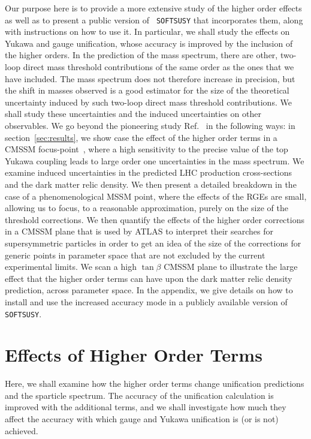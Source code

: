 \documentclass[final,3p,times,pdflatex]{elsarticle}
\begin{document}
Our purpose here is to provide a more extensive
study of the higher order effects as well as to present a public version of {\tt
  SOFTSUSY} that incorporates them, along with instructions on how to use it.
In particular, we shall study the effects on Yukawa and gauge unification,
whose accuracy is improved by the inclusion of the higher orders.
In the prediction of the mass spectrum, there are other, two-loop direct mass
threshold 
contributions of the same order as the ones that we have included. The mass
spectrum does not therefore increase in precision, but the shift in masses
observed 
is a good estimator for the size of the theoretical uncertainty induced by
such two-loop direct mass threshold contributions. We shall study these
uncertainties and the induced uncertainties on other observables.
We go beyond the pioneering study Ref.~\cite{Bednyakov:2010ni} in the
following ways: in section~\ref{sec:results}, we show case the effect of the
higher order terms in a CMSSM  
focus-point~\cite{Chan:1997bi,Feng:1999mn,Feng:1999zg}, where a high
sensitivity to the precise value of the top Yukawa 
coupling leads to large order one uncertainties in the mass spectrum. 
We examine induced uncertainties in the predicted LHC production
cross-sections and the dark matter relic density.
We then present a detailed
breakdown in the case of a phenomenological MSSM point, where the effects of
the RGEs are 
small, allowing us to focus, to a reasonable approximation, purely on the size
of the threshold corrections. We then quantify the effects of the higher order
corrections in a CMSSM plane that is used by ATLAS to interpret their searches
for supersymmetric particles in order to get an idea of the size of the
corrections for generic points in parameter space that are not excluded by the
current experimental limits. 
We scan a high $\tan \beta$ CMSSM plane to illustrate the large effect that the
higher order terms can have upon the dark matter relic density prediction,
across parameter space. 
In the appendix, we give details on how to install and use the increased
accuracy mode in a publicly available version of {\tt SOFTSUSY}.

\section{Effects of Higher Order Terms
 \label{sec:results}} 
Here, we shall examine how the higher order terms change unification
predictions and the sparticle spectrum. The accuracy of the unification 
calculation
is
improved with the additional terms, and we shall investigate how much they
affect the accuracy with which gauge and Yukawa unification is (or is not)
achieved. 
\end{document}
